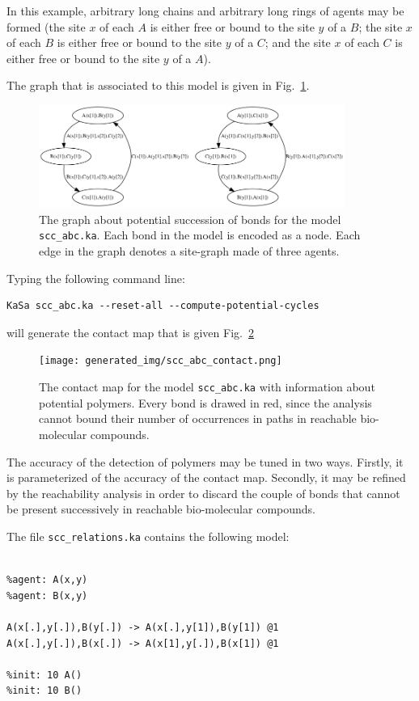 \documentclass[11pt]{book}
\begin{document}
In this example, arbitrary long chains and arbitrary long rings of agents may be formed (the site $x$ of each $A$ is either free or bound to the site $y$ of a $B$;  the site $x$ of each $B$ is either free or bound to the site $y$ of a $C$; and the site $x$ of each $C$ is either free or bound to the site $y$ of a $A$).

The graph that is associated to this model is given in Fig.~\ref{fig:scc-graph}.
\begin{figure}[htbp]
\centering
\includegraphics[width=10cm]{img/graph.png}
\caption{The graph about potential succession of bonds for the model \texttt{scc\_abc.ka}. Each bond in the model is encoded as a node. Each edge in the graph denotes a site-graph made of three agents.  }
\label{fig:scc-graph}
\end{figure}

Typing the following command line:
\begin{verbatim}
KaSa scc_abc.ka --reset-all --compute-potential-cycles
\end{verbatim}
will generate the contact map that is given Fig.~\ref{fig:cm-scc-abc}

\begin{figure}[htbp]
\centering
\texttt{[image: generated\_img/scc\_abc\_contact.png]}
\caption{The contact map for the model \texttt{scc\_abc.ka} with information about potential polymers. Every bond is drawed in red, since the analysis cannot bound their number of occurrences in paths in reachable bio-molecular compounds.}
\label{fig:cm-scc-abc}
\end{figure}

The accuracy of the detection of polymers may be tuned in two ways.
Firstly, it is parameterized of the accuracy of the contact map. Secondly, it may be refined by the reachability analysis in order to discard the couple of bonds that cannot be present successively in reachable bio-molecular compounds.

The file \texttt{scc\_relations.ka} contains the following model:
\begin{lstlisting}[language=kappa]

%agent: A(x,y)
%agent: B(x,y)

A(x[.],y[.]),B(y[.]) -> A(x[.],y[1]),B(y[1]) @1
A(x[.],y[.]),B(x[.]) -> A(x[1],y[.]),B(x[1]) @1

%init: 10 A()
%init: 10 B()
\end{lstlisting}
\end{document}
